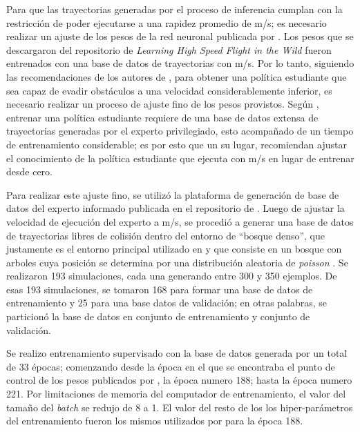 Para que las trayectorias generadas por el proceso de inferencia cumplan con la restricción de poder ejecutarse a una rapidez promedio de  m/s; es necesario realizar un ajuste de los pesos de la red neuronal publicada por \cite{Loquercio2021}. Los pesos que se descargaron del repositorio de \textit{Learning High Speed Flight in the Wild} fueron entrenados con una base de datos de trayectorias con  m/s. Por lo tanto, siguiendo las recomendaciones de los autores de \cite{Loquercio2021}, para obtener una política estudiante que sea capaz de evadir obstáculos a una velocidad considerablemente inferior, es necesario realizar un proceso de ajuste fino de los pesos provistos. Según \cite{Loquercio2021}, entrenar una política estudiante requiere de una base de datos extensa de trayectorias generadas por el experto privilegiado, esto acompañado de un tiempo de entrenamiento considerable; es por esto que un su lugar, recomiendan ajustar el conocimiento de la política estudiante que ejecuta con  m/s en lugar de entrenar desde cero.

Para realizar este ajuste fino, se utilizó la plataforma de generación de base de datos del experto informado publicada en el repositorio de \cite{Loquercio2021}. Luego de ajustar la velocidad de ejecución del experto a  m/s, se procedió a generar una base de datos de trayectorias libres de colisión dentro del entorno de ``bosque denso'', que justamente es el entorno principal utilizado en \cite{Loquercio2021} y que consiste en un bosque con arboles cuya posición se determina por una distribución aleatoria de \textit{poisson} \cite{Loquercio2021}. Se realizaron 193 simulaciones, cada una generando entre 300 y 350 ejemplos. De esas 193 simulaciones, se tomaron 168 para formar una base de datos de entrenamiento y 25 para una base datos de validación; en otras palabras, se particionó la base de datos en  conjunto de entrenamiento y  conjunto de validación.

Se realizo entrenamiento supervisado con la base de datos generada por un total de 33 épocas; comenzando desde la época en el que se encontraba el punto de control de los pesos publicados por \cite{Loquercio2021}, la época numero 188; hasta la época numero 221. Por limitaciones de memoria del computador de entrenamiento, el valor del tamaño del \textit{batch} se redujo de 8 a 1. El valor del resto de los los hiper-parámetros del entrenamiento fueron los mismos utilizados por \cite{Loquercio2021} para la época 188.

